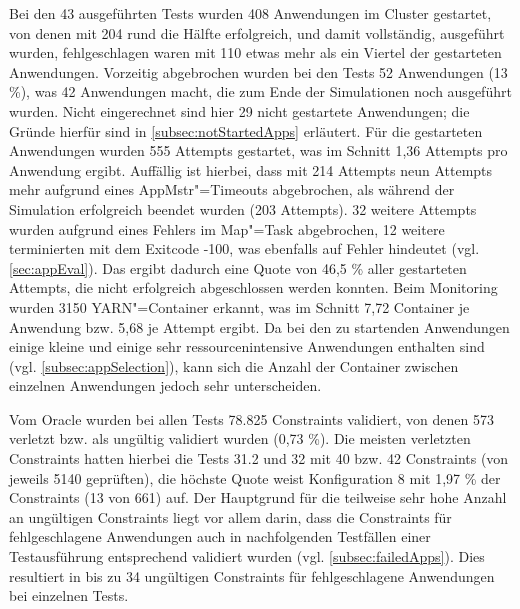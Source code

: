 Bei den 43 ausgeführten Tests wurden 408 Anwendungen im Cluster gestartet, von denen mit 204 rund die Hälfte erfolgreich, und damit vollständig, ausgeführt wurden, fehlgeschlagen waren mit 110 etwas mehr als ein Viertel der gestarteten Anwendungen.
Vorzeitig abgebrochen wurden bei den Tests 52 Anwendungen (13 \%), was 42 Anwendungen macht, die zum Ende der Simulationen noch ausgeführt wurden.
Nicht eingerechnet sind hier 29 nicht gestartete Anwendungen; die Gründe hierfür sind in \cref{subsec:notStartedApps} erläutert.
Für die gestarteten Anwendungen wurden 555 Attempts gestartet, was im Schnitt 1,36 Attempts pro Anwendung ergibt.
Auffällig ist hierbei, dass mit 214 Attempts neun Attempts mehr aufgrund eines \gls{AppMstr}"=Timeouts abgebrochen, als während der Simulation erfolgreich beendet wurden (203 Attempts).
32 weitere Attempts wurden aufgrund eines Fehlers im Map"=Task abgebrochen, 12 weitere terminierten mit dem Exitcode -100, was ebenfalls auf Fehler hindeutet (vgl. \cref{sec:appEval}).
Das ergibt dadurch eine Quote von 46,5 \% aller gestarteten Attempts, die nicht erfolgreich abgeschlossen werden konnten.
Beim Monitoring wurden 3150 YARN"=Container erkannt, was im Schnitt 7,72 Container je Anwendung bzw. 5,68 je Attempt ergibt.
Da bei den zu startenden Anwendungen einige kleine und einige sehr ressourcenintensive Anwendungen enthalten sind (vgl. \cref{subsec:appSelection}), kann sich die Anzahl der Container zwischen einzelnen Anwendungen jedoch sehr unterscheiden.

Vom Oracle wurden bei allen Tests 78.825 Constraints validiert, von denen 573 verletzt bzw. als ungültig validiert wurden (0,73 \%).
Die meisten verletzten Constraints hatten hierbei die Tests 31.2 und 32 mit 40 bzw. 42 Constraints (von jeweils 5140 geprüften), die höchste Quote weist Konfiguration 8 mit 1,97 \% der Constraints (13 von 661) auf.
Der Hauptgrund für die teilweise sehr hohe Anzahl an ungültigen Constraints liegt vor allem darin, dass die Constraints für fehlgeschlagene Anwendungen auch in nachfolgenden Testfällen einer Testausführung entsprechend validiert wurden (vgl. \cref{subsec:failedApps}).
Dies resultiert in bis zu 34 ungültigen Constraints für fehlgeschlagene Anwendungen bei einzelnen Tests.
